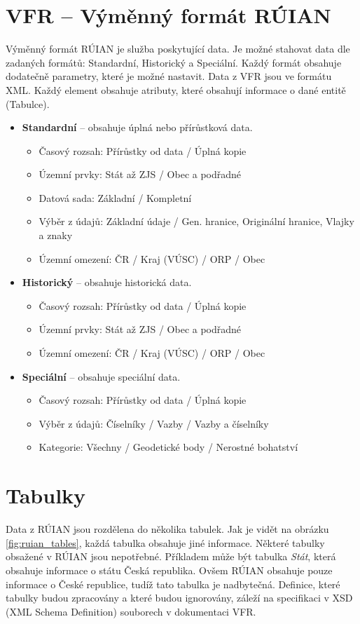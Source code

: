 \documentclass[czech, kiv, ba, he, iso690alph, pdf]{fasthesis}
\begin{document}
\section{VFR -- Výměnný formát RÚIAN}
Výměnný formát RÚIAN je služba poskytující data.
Je možné stahovat data dle zadaných formátů: Standardní, Historický a Speciální.
Každý formát obsahuje dodatečně parametry, které je možné nastavit.
Data z VFR jsou ve formátu XML.
Každý element obsahuje atributy, které obsahují informace o dané entitě (Tabulce).
\pagebreak
\begin {itemize}
    \item \textbf{Standardní} -- obsahuje úplná nebo přírůstková data.
    \begin {itemize}
        \item Časový rozsah: Přírůstky od data / Úplná kopie
        \item Územní prvky: Stát až ZJS / Obec a podřadné
        \item Datová sada: Základní / Kompletní
        \item Výběr z údajů: Základní údaje / Gen. hranice, Originální hranice, Vlajky a znaky
        \item Územní omezení: ČR / Kraj (VÚSC) / ORP / Obec
    \end {itemize}
    \item \textbf{Historický} -- obsahuje historická data.
    \begin {itemize}
        \item Časový rozsah: Přírůstky od data / Úplná kopie
        \item Územní prvky: Stát až ZJS / Obec a podřadné
        \item Územní omezení: ČR / Kraj (VÚSC) / ORP / Obec
    \end {itemize}
    \item \textbf{Speciální} -- obsahuje speciální data.
    \begin {itemize}
        \item Časový rozsah: Přírůstky od data / Úplná kopie
        \item Výběr z údajů: Číselníky / Vazby / Vazby a číselníky
        \item Kategorie: Všechny / Geodetické body / Nerostné bohatství
    \end {itemize}
\end {itemize}

\section{Tabulky}
Data z RÚIAN jsou rozdělena do několika tabulek.
Jak je vidět na obrázku \ref{fig:ruian_tables}, každá tabulka obsahuje jiné informace.
Některé tabulky obsažené v RÚIAN jsou nepotřebné. 
Příkladem může být tabulka \textit{Stát}, která obsahuje informace o státu Česká republika.
Ovšem RÚIAN obsahuje pouze informace o České republice, tudíž tato tabulka je nadbytečná.
Definice, které tabulky budou zpracovány a které budou ignorovány, záleží na specifikaci v XSD (XML Schema Definition) souborech v dokumentaci VFR. 
\end{document}
